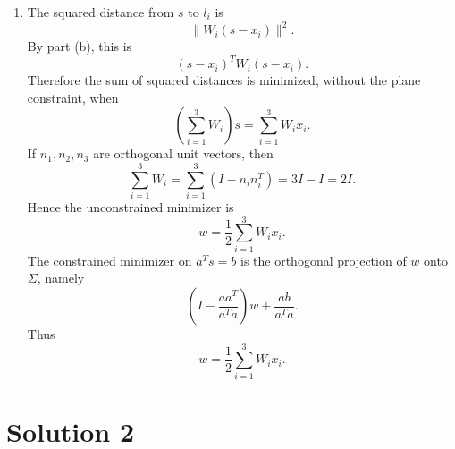 \documentclass[10pt,a4paper]{article}
\begin{document}
\begin{enumerate}
\begin{enumerate}
          \item The squared distance from $s$ to $l_i$ is
                \[
                  \|W_i(s-x_i)\|^2.
                \]
                By part (b), this is
                \[
                  (s-x_i)^TW_i(s-x_i).
                \]
                Therefore the sum of squared distances is minimized, without the plane constraint, when
                \[
                  \left(\sum_{i=1}^3W_i\right)s
                  =
                  \sum_{i=1}^3W_ix_i.
                \]
                If $n_1,n_2,n_3$ are orthogonal unit vectors, then
                \[
                  \sum_{i=1}^3W_i
                  =
                  \sum_{i=1}^3(I-n_in_i^T)
                  =
                  3I-I
                  =
                  2I.
                \]
                Hence the unconstrained minimizer is
                \[
                  w=\frac12\sum_{i=1}^3W_ix_i.
                \]
                The constrained minimizer on $a^Ts=b$ is the orthogonal projection of $w$ onto $\Sigma$, namely
                \[
                  \left(I-\frac{aa^T}{a^Ta}\right)w+\frac{ab}{a^Ta}.
                \]
                Thus
                \[
                  \boxed{
                  w=\frac12\sum_{i=1}^3W_ix_i.}
                \]
        \end{enumerate}
\end{enumerate}

\section*{Solution 2}
\end{document}
